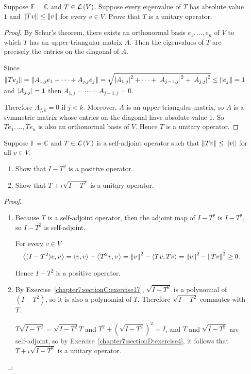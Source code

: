 \begin{exercise}
    Suppose $\mathbb{F} = \mathbb{C}$ and $T\in\mathcal{L}\left({V}\right)$. Suppose every eigenvalue of $T$ has absolute value $1$ and $\left\Vert{Tv}\right\Vert\leq\left\Vert{v}\right\Vert$ for every $v\in V$. Prove that $T$ is a unitary operator.
\end{exercise}

\begin{proof}
    By Schur's theorem, there exists an orthonormal basis $e_{1}, \ldots, e_{n}$ of $V$ to which $T$ has an upper-triangular matrix $A$. Then the eigenvalues of $T$ are precisely the entries on the diagonal of $A$.

    Since $\left\Vert{Te_{j}}\right\Vert = \left\Vert{A_{1,j}e_{1} + \cdots + A_{j,j}e_{j}}\right\Vert = \sqrt{\left\vert{A_{1,j}}\right\vert^{2} + \cdots + \left\vert{A_{j-1,j}}\right\vert^{2} + \left\vert{A_{j,j}}\right\vert^{2}} \leq \left\Vert{e_{j}}\right\Vert = 1$ and $\left\vert{A_{j,j}}\right\vert = 1$ then $A_{1,j} = \cdots = A_{j-1,j} = 0$.

    Therefore $A_{j,k} = 0$ if $j < k$. Moreover, $A$ is an upper-triangular matrix, so $A$ is a symmetric matrix whose entries on the diagonal have absolute value $1$. So $Te_{1}, \ldots, Te_{n}$ is also an orthonormal basis of $V$. Hence $T$ is a unitary operator.
\end{proof}
\newpage

\begin{exercise}
    Suppose $\mathbb{F} = \mathbb{C}$ and $T\in\mathcal{L}\left({V}\right)$ is a self-adjoint operator such that $\left\Vert{Tv}\right\Vert\leq \left\Vert{v}\right\Vert$ for all $v\in V$.
    \begin{enumerate}[label={(\alph*)}]
        \item Show that $I - T^{2}$ is a positive operator.
        \item Show that $T + \iota\sqrt{I - T^{2}}$ is a unitary operator.
    \end{enumerate}
\end{exercise}

\begin{proof}
    \begin{enumerate}[label={(\alph*)}]
        \item Because $T$ is a self-adjoint operator, then the adjoint map of $I - T^{2}$ is $I - T^{2}$, so $I - T^{2}$ is self-adjoint.

              For every $v\in V$
              \[
                  \left\langle{(I - T^{2})v, v}\right\rangle = \left\langle{v, v}\right\rangle - \left\langle{T^{2}v, v}\right\rangle = \left\Vert{v}\right\Vert^{2} - \left\langle{Tv, Tv}\right\rangle = \left\Vert{v}\right\Vert^{2} - \left\Vert{Tv}\right\Vert^{2}\geq 0.
              \]

              Hence $I - T^{2}$ is a positive operator.
        \item By Exercise~\ref{chapter7:sectionC:exercise17}, $\sqrt{I - T^{2}}$ is a polynomial of $(I - T^{2})$, so it is also a polynomial of $T$. Therefore $\sqrt{I - T^{2}}$ commutes with $T$.

              $T\sqrt{I - T^{2}} = \sqrt{I - T^{2}}T$ and $T^{2} + {(\sqrt{I - T^{2}})}^{2} = I$, and $T$ and $\sqrt{I - T^{2}}$ are self-adjoint, so by Exercise~\ref{chapter7:sectionD:exercise4}, it follows that $T + \iota\sqrt{I - T^{2}}$ is a unitary operator.
    \end{enumerate}
\end{proof}
\newpage

